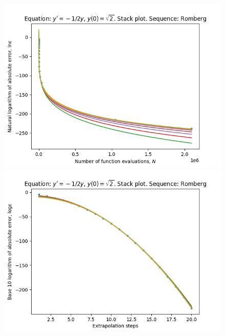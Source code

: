 \begin{figure}[H]
\centering
\begin{minipage}{0.45\textwidth}
\centering
\includegraphics[scale=0.45]{../results/emr_plots/quad_sing_0_hp_romberg_stack.png}
\end{minipage}
\begin{minipage}{0.45\textwidth}
\centering
\includegraphics[scale=0.45]{../results/emr_plots/quad_sing_0_hp_romberg_steps_stack.png}
\end{minipage}
\end{figure}

